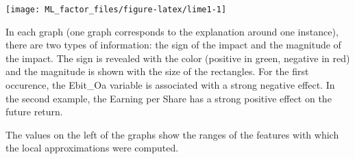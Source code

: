\documentclass[]{krantz}
\makeatletter
\newenvironment{Shaded}{\begin{snugshade}}{\end{snugshade}}
\newcommand{\CommentTok}[1]{\textcolor[rgb]{0.37,0.37,0.37}{\textit{#1}}}
\newcommand{\DataTypeTok}[1]{\textcolor[rgb]{0.27,0.27,0.27}{#1}}
\newcommand{\DecValTok}[1]{\textcolor[rgb]{0.06,0.06,0.06}{#1}}
\newcommand{\KeywordTok}[1]{\textcolor[rgb]{0.27,0.27,0.27}{\textbf{#1}}}
\newcommand{\NormalTok}[1]{#1}
\newcommand{\OperatorTok}[1]{\textcolor[rgb]{0.43,0.43,0.43}{\textbf{#1}}}
\newcommand{\StringTok}[1]{\textcolor[rgb]{0.5,0.5,0.5}{#1}}
\newenvironment{kframe}{%
\medskip{}
\setlength{\fboxsep}{.8em}
 \def\at@end@of@kframe{}%
 \ifinner\ifhmode%
  \def\at@end@of@kframe{\end{minipage}}%
  \begin{minipage}{\columnwidth}%
 \fi\fi%
 \def\FrameCommand##1{\hskip\@totalleftmargin \hskip-\fboxsep
 \colorbox{shadecolor}{##1}\hskip-\fboxsep
     \hskip-\linewidth \hskip-\@totalleftmargin \hskip\columnwidth}%
 \MakeFramed {\advance\hsize-\width
   \@totalleftmargin\z@ \linewidth\hsize
   \@setminipage}}%
 {\par\unskip\endMakeFramed%
 \at@end@of@kframe}
\renewenvironment{Shaded}{\begin{kframe}}{\end{kframe}}
\theoremstyle{definition}
\theoremstyle{definition}
\theoremstyle{definition}
\theoremstyle{remark}
\makeatother
\begin{document}
\begin{Shaded}
\end{Shaded}

\begin{center}\texttt{[image: ML\_factor\_files/figure-latex/lime1-1]} \end{center}

\normalsize

In each graph (one graph corresponds to the explanation around one
instance), there are two types of information: the sign of the impact
and the magnitude of the impact. The sign is revealed with the color
(positive in green, negative in red) and the magnitude is shown with the
size of the rectangles. For the first occurence, the Ebit\_Oa variable
is associated with a strong negative effect. In the second example, the
Earning per Share has a strong positive effect on the future return.

The values on the left of the graphs show the ranges of the features
with which the local approximations were computed.
\end{document}
